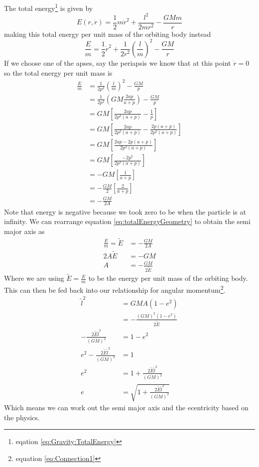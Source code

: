 The total energy\footnote{eqation \ref{eq:Gravity:TotalEnergy}} is given by
\begin{equation*}
E(r,\dot{r})=\frac{1}{2}m \dot{r}^2 +  \frac{l^2}{2mr^2} - \frac{GMm}{r}
\end{equation*}
making this total energy per unit mass of the orbiting body instead
\begin{equation}
\frac{E}{m}=\frac{1}{2} \dot{r}^2 +  \frac{1}{2r^2}\left(\frac{l}{m}\right)^2 - \frac{GM}{r}
\end{equation}
If we choose one of the apses, say the periapsis we know that at this point $\dot{r}=0$ so the total energy per unit mass is
\begin{align}
\frac{E}{m}&= \frac{1}{2p^2}\left(\frac{l}{m}\right)^2 - \frac{GM}{p}\nonumber \\
&=\frac{1}{2p^2}\left(GM\frac{2ap}{a+p}\right) - \frac{GM}{p}\nonumber \\
&=GM\left[\frac{2ap}{2p^2(a+p)} - \frac{1}{p}\right]\nonumber \\
&=GM\left[\frac{2ap}{2p^2(a+p)} - \frac{2p(a+p)}{2p^2(a+p)}\right]\nonumber \\
&=GM\left[\frac{2ap-2p(a+p)}{2p^2(a+p)}\right]\nonumber \\
&=GM\left[\frac{-2p^2}{2p^2(a+p)}\right]\nonumber \\
&=-GM\left[\frac{1}{a+p}\right]\nonumber \\
&=-\frac{GM}{2}\left[\frac{2}{a+p}\right]\nonumber \\
&=-\frac{GM}{2A} \label{eq:totalEnergyGeometry}
\end{align}
Note that energy is negative because we took zero to be when the particle is at infinity. We can rearrange equation \ref{eq:totalEnergyGeometry} to obtain the semi major axis as
\begin{align}
\frac{E}{m}=\tilde{E}&=-\frac{GM}{2A}\nonumber \\
2A\tilde{E}&=-{GM}\nonumber \\
A&=-\frac{GM}{2\tilde{E}}
\end{align}
Where we are using $\tilde{E}=\frac{E}{m}$ to be the energy per unit mass of the orbiting body. This can then be fed back into our relationship for angular momentum\footnote{equation \ref{eq:Connection1}}.
\begin{align}
\tilde{l}^2 &= GMA(1-e^2)\nonumber \\
&=-\frac{(GM)^2(1-e^2)}{2\tilde{E}}\nonumber \\
-\frac{2\tilde{E}\tilde{l}^2}{(GM)^2}&=1-e^2\nonumber \\
e^2-\frac{2\tilde{E}\tilde{l}^2}{(GM)^2}&=1\nonumber \\
e^2&=1+\frac{2\tilde{E}\tilde{l}^2}{(GM)^2}\nonumber \\
e&=\sqrt{1+\frac{2\tilde{E}\tilde{l}^2}{(GM)^2}}
\end{align}
Which means we can work out the semi major axis and the ecentricity based on the physics.

